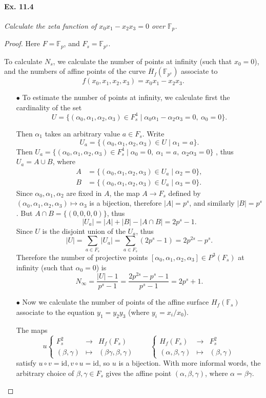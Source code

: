 \documentclass[11pt,a4paper]{article}
\newcommand{\F}{\mathbb{F}}
\begin{document}
\paragraph{Ex. 11.4}{\it Calculate the zeta function of $x_0 x_1 - x_2 x_3 = 0$ over $\F_p$.
}
\begin{proof}
Here $F = \F_p$, and $F_s = \F_{p^s}$.

To calculate $N_s$, we calculate the number of points at infinity (such that $x_0 = 0$), and the numbers of affine points of the curve $\overline{H}_f(\F_{p^s})$ associate to $$f(x_0,x_1,x_2,x_3) = x_0 x_1 - x_2 x_3.$$
\begin{enumerate}
\item[$\bullet$] To estimate the number of points at infinity, we calculate first the cardinality of the set
$$U = \{(\alpha_0,\alpha_1,\alpha_2,\alpha_3) \in F_s^4 \mid \alpha_0 \alpha_1 - \alpha_2  \alpha_3 =0,\ \alpha_0 = 0\}.$$ 

Then $\alpha_1$ takes an arbitrary value $a \in F_s$. Write
$$U_a =\{(\alpha_0,\alpha_1,\alpha_2,\alpha_3) \in U \mid  \alpha_1 = a\}.$$
Then $U_a =\{(\alpha_0,\alpha_1,\alpha_2,\alpha_3) \in  F_s^4\mid  \alpha_0 = 0,\ \alpha_1 = a,\ \alpha_2\alpha_3 = 0\}$ , thus $U_a = A \cup B$, where 
\begin{align*}
A &= \{(\alpha_0,\alpha_1,\alpha_2,\alpha_3) \in U_a \mid \alpha_2 = 0\},\\
B &= \{(\alpha_0,\alpha_1,\alpha_2,\alpha_3) \in U_a \mid \alpha_3 = 0\}.
\end{align*}
Since $\alpha_0,\alpha_1,\alpha_2$ are fixed in $A$, the map $A \to F_s$ defined by $(\alpha_0,\alpha_1,\alpha_2,\alpha_3) \mapsto \alpha_3$ is a bijection, therefore $|A| = p^s$, and similarly $|B| = p^s$. But $A\cap B = \{(0,0,0,0)\}$, thus 
$$|U_a| = |A| + |B| - |A\cap B| = 2p^s - 1.$$
Since $U$ is the disjoint union of the $U_a$, thus
$$|U| = \sum_{a\in F_s} |U_a| = \sum_{a\in F_s} (2p^s - 1) = 2p^{2s} - p^s .$$
Therefore the number of projective points $[\alpha_0,\alpha_1,\alpha_2,\alpha_3] \in P^3(F_s)$ at infinity (such that $\alpha_0 = 0$) is
$$N_\infty = \frac{|U|-1}{p^s-1} =\frac{ 2p^{2s} - p^s -1}{p^s-1} = 2p^s+1.$$

\item[$\bullet$] Now we calculate the number of points of the affine surface $H_f(\F_s)$ associate to the equation $y_1 = y_2 y_3$ (where $y_i = x_i/x_0$).

The maps 
$$
u
\left\{
\begin{array}{ccl}
F_s^2 & \to & H_f(F_s)\\
(\beta, \gamma) & \mapsto &(\beta \gamma, \beta, \gamma)
\end{array}
\right.
\qquad
\left\{
\begin{array}{ccl}
H_f(F_s) & \to & F_s^2\\
(\alpha,\beta, \gamma) & \mapsto & ( \beta, \gamma)
\end{array}
\right.
$$
satisfy $u \circ v = \mathrm{id}, v\circ u = \mathrm{id}$, so $u$ is a bijection. With more informal words, the arbitrary choice of $\beta, \gamma \in F_s$ gives the affine point $(\alpha,\beta,\gamma)$, where $\alpha = \beta \gamma$.


\end{enumerate}
\end{proof}
\end{document}
